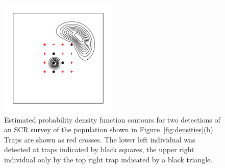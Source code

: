 \documentclass[10pt,a4paper]{article}
\begin{document}
\begin{figure}[htbp]
\centering
\includegraphics[width=0.5\textwidth]{screrr.pdf}
\caption{Estimated probability density function contours for two detections of an SCR survey of the population shown in Figure~\ref{fig:densities}(b). Traps are shown as red crosses. The lower left individual was detected at traps indicated by black squares, the upper right individual only by the top right trap indicated by a black triangle.}
\label{fig:screrr}
\end{figure}


\end{document}
